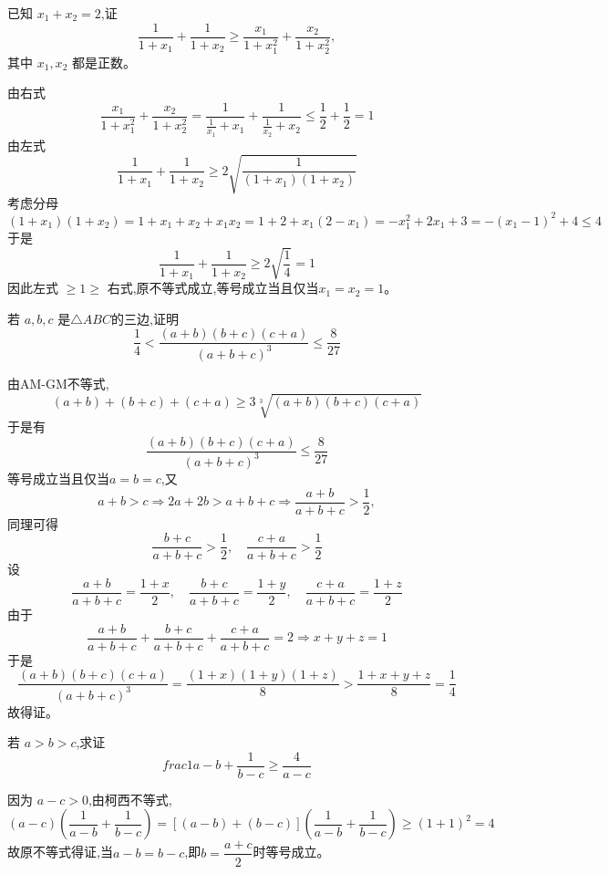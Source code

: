 \begin{questions}
    \question 已知 $x_1 + x_2 = 2$,证 
    \[
    \frac{1}{1+x_1} + \frac{1}{1+x_2} \ge \frac{x_1}{1+x_1^2} + \frac{x_2}{1+x_2^2},
    \]
    其中 $x_1,x_2$ 都是正数。
    \begin{solution}
        由右式 
        \[
        \frac{x_1}{1+x_1^2} + \frac{x_2}{1+x_2^2} = \frac{1}{\frac{1}{x_1} + x_1} + \frac{1}{\frac{1}{x_2} + x_2} \le \frac{1}{2} + \frac{1}{2} = 1
        \]
        由左式 
        \[
        \frac{1}{1+x_1} + \frac{1}{1+x_2} \ge 2\sqrt{\frac{1}{(1+x_1)(1+x_2)}}
        \]
        考虑分母 
        \[
        (1+x_1)(1+x_2) = 1 + x_1 + x_2 + x_1x_2 = 1 + 2 + x_1(2-x_1) = -x_1^2 + 2x_1 + 3 = -(x_1-1)^2 + 4 \le 4
        \]
        于是
        \[
        \frac{1}{1+x_1} + \frac{1}{1+x_2} \ge 2\sqrt{\frac{1}{4}} = 1
        \]
        因此左式 $\ge 1 \ge$ 右式,原不等式成立,等号成立当且仅当$x_1=x_2=1$。
    \end{solution}

    \question 若 $a, b, c$ 是$\triangle ABC$的三边,证明 
    \[
    \frac{1}{4} < \frac{(a+b)(b+c)(c+a)}{(a+b+c)^3} \le \frac{8}{27}
    \]
    \begin{solution}
        由AM-GM不等式, 
        \[
        (a+b) + (b+c) + (c+a) \ge 3 \sqrt[3]{(a+b)(b+c)(c+a)}\]
        于是有
        \[
        \frac{(a+b)(b+c)(c+a)}{(a+b+c)^3} \le \frac{8}{27}
        \]
        等号成立当且仅当$a=b=c$,又 
        \[
        a+b > c \Rightarrow 2a+2b > a+b+c \Rightarrow \frac{a+b}{a+b+c} > \frac{1}{2},
        \]
        同理可得 
        \[
        \frac{b+c}{a+b+c} > \frac{1}{2},\quad \frac{c+a}{a+b+c} > \frac{1}{2}
        \]
        设 
        \[
        \frac{a+b}{a+b+c} = \frac{1+x}{2},\quad \frac{b+c}{a+b+c} = \frac{1+y}{2},\quad \frac{c+a}{a+b+c} = \frac{1+z}{2}
        \]
        由于 
        \[
        \frac{a+b}{a+b+c} + \frac{b+c}{a+b+c} + \frac{c+a}{a+b+c} = 2 \Rightarrow x+y+z = 1
        \]
        于是 
        \[
        \frac{(a+b)(b+c)(c+a)}{(a+b+c)^3} = \frac{(1+x)(1+y)(1+z)}{8} > \frac{1+x+y+z}{8} = \frac{1}{4}
        \]
        故得证。
    \end{solution}

    \question 若 $a > b > c$,求证
    \[
    frac{1}{a-b} + \frac{1}{b-c} \ge \frac{4}{a-c}
    \]
    \begin{solution}
        因为 $a-c > 0$,由柯西不等式,
        \[
        (a-c)\left(\frac{1}{a-b} + \frac{1}{b-c}\right) = [(a-b) + (b-c)]\left(\frac{1}{a-b} + \frac{1}{b-c}\right) \ge (1 + 1)^2 = 4
        \]
        故原不等式得证,当$a - b = b - c$,即$b = \dfrac{a + c}{2}$时等号成立。
    \end{solution}


\end{questions}
